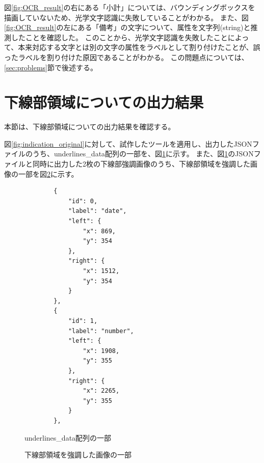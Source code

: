 図\ref{fig:OCR_result}の右にある「小計」については、バウンディングボックスを描画していないため、光学文字認識に失敗していることがわかる。
また、図\ref{fig:OCR_result}の左にある「備考」の文字について、属性を文字列(string)と推測したことを確認した。
このことから、光学文字認識を失敗したことによって、本来対応する文字とは別の文字の属性をラベルとして割り付けたことが、誤ったラベルを割り付けた原因であることがわかる。
この問題点については、\ref{sec:problems}節で後述する。

\section{下線部領域についての出力結果}\label{sec:result_underline}
本節は、下線部領域についての出力結果を確認する。

図\ref{fig:indication_original}に対して、試作したツールを適用し、出力したJSONファイルのうち、underlines\_data配列の一部を、図\ref{fig:underlines_data_json}に示す。
また、図\ref{fig:underlines_data_json}のJSONファイルと同時に出力した2枚の下線部強調画像のうち、下線部領域を強調した画像の一部を図\ref{fig:highlighted_underlines_part}に示す。
\lstset{language=}
\begin{figure}[tp]
    \begin{lstlisting}
        {
            "id": 0,
            "label": "date",
            "left": {
                "x": 869,
                "y": 354
            },
            "right": {
                "x": 1512,
                "y": 354
            }
        },
        {
            "id": 1,
            "label": "number",
            "left": {
                "x": 1908,
                "y": 355
            },
            "right": {
                "x": 2265,
                "y": 355
            }
        },
    \end{lstlisting}
    \caption{underlines\_data配列の一部}\label{fig:underlines_data_json}
\end{figure}
\begin{figure}[tp]
    \begin{center}
        \caption{下線部領域を強調した画像の一部}
        \label{fig:highlighted_underlines_part}
    \end{center}
\end{figure}
